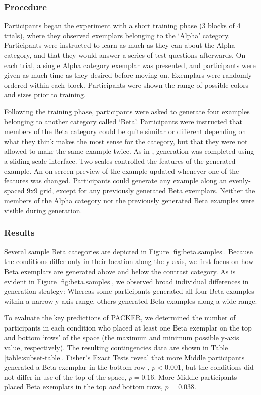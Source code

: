 \documentclass[10pt,letterpaper]{article}
\begin{document}
\subsubsection{Procedure}

Participants began the experiment with a short training phase (3 blocks of 4 trials), where they observed exemplars belonging to the `Alpha' category. Participants were instructed to learn as much as they can about the Alpha category, and that they would answer a series of test questions afterwards. On each trial, a single Alpha category exemplar was presented, and participants were given as much time as they desired before moving on. Exemplars were randomly ordered within each block. Participants were shown the range of possible colors and sizes prior to training.

Following the training phase, participants were asked to generate four examples belonging to another category called `Beta'. Participants were instructed that members of the Beta category could be quite similar or different depending on what they think makes the most sense for the category, but that they were not allowed to make the same example twice. As in \citet{jern2013probabilistic}, generation was completed using a sliding-scale interface. Two scales controlled the features of the generated example. An on-screen preview of the example updated whenever one of the features was changed. Participants could generate any example along an evenly-spaced 9x9 grid, except for any previously generated Beta exemplars. Neither the members of the Alpha category nor the previously generated Beta examples were visible during generation. 

\subsubsection{Results}

Several sample Beta categories are depicted in Figure \ref{fig:beta.samples}. Because the conditions differ only in their location along the y-axis, we first focus on how Beta exemplars are generated above and below the contrast category. As is evident in Figure \ref{fig:beta.samples}, we observed broad individual differences in generation strategy: Whereas some participants generated all four Beta examples within a narrow y-axis range, others generated Beta examples along a wide range. 

To evaluate the key predictions of PACKER, we determined the number of participants in each condition who placed at least one Beta exemplar on the top and bottom `rows' of the space (the maximum and minimum possible y-axis value, respectively). The resulting contingencies data are shown in Table \ref{table:subset-table}. Fisher's Exact Tests reveal that more Middle participants generated a Beta exemplar in the bottom row , $p < 0.001$, but the conditions did not differ in use of the top of the space, $p = 0.16$. More Middle participants placed Beta exemplars in the top \textit{and} bottom rows, $p = 0.038$. 
\end{document}
